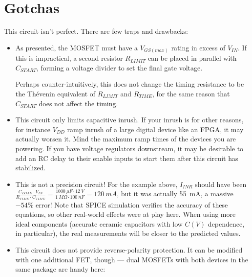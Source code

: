 \documentclass[letterpaper,12pt]{article}
\begin{document}
\section{Gotchas}
\label{sec:gotchas}

This circuit isn't perfect. There are few traps and drawbacks:

\begin{itemize}
\item{As presented, the MOSFET must have a $V_{GS(max)}$ rating in excess of $V_{IN}$.
If this is impractical, a second resistor $R_{LIMIT}$ can be placed in parallel with $C_{START}$,
forming a voltage divider to set the final gate voltage.

Perhaps counter-intuitively, this does not change the timing resistance to be the
Th\'evenin equivalent of $R_{LIMIT}$ and $R_{TIME}$, for the same reason that $C_{START}$ does
not affect the timing.}

\item{This circuit only limits capacitive inrush. If your inrush is for other reasons,
for instance $V_{DD}$ ramp inrush of a large digital device like an FPGA, it may actually
worsen it. Mind the maximum ramp times of the devices you are powering. If you have voltage
regulators downstream, it may be desirable to add an RC delay to their enable inputs to start
them after this circuit has stabilized.}

\item{This is not a precision circuit! For the example above, $I_{INR}$ should have been
$\frac{C_{LOAD} \cdot V_{IN}}{R_{TIME} \cdot C_{TIME}} = \frac{\SI{1000}{\mu F} \cdot \SI{12}{V}}{\SI{1}{M\Omega} \cdot \SI{100}{nF}} = \SI{120}{mA} $,
but it was actually \SI{55}{mA}, a massive $-54\%$ error! Note that SPICE simulation verifies the
accuracy of these equations, so other real-world effects were at play here. When using more ideal
components (accurate ceramic capacitors with low $C(V)$ dependence, in particular), the real measurements
will be closer to the predicted values.}

\item{This circuit does not provide reverse-polarity protection. It can be modified with one
additional FET, though --- dual MOSFETs with both devices in the same package are handy here:}
\end{itemize}
\end{document}
